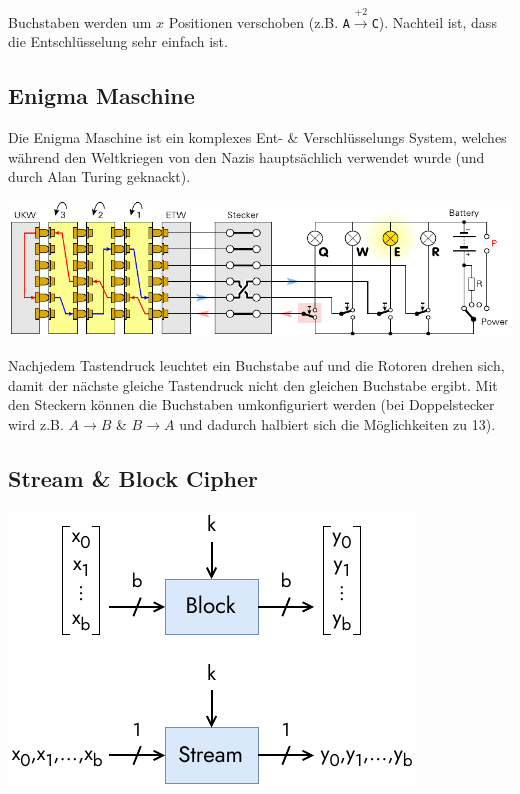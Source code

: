 \documentclass[
  10pt,
  a4paper,
  twocolumn]{article}
\begin{document}
Buchstaben werden um \(x\) Positionen verschoben (z.B.
\texttt{A}\(\overset{+2}{\rightarrow}\)\texttt{C}). Nachteil ist, dass
die Entschlüsselung sehr einfach ist.

\subsection{\texorpdfstring{Enigma Maschine
\href{https://www.youtube.com/watch?v=ybkkiGtJmkM}{\color{BrickRed}\faYoutube}}{Enigma Maschine }}\label{enigma-maschine}

Die Enigma Maschine ist ein komplexes Ent- \& Verschlüsselungs System,
welches während den Weltkriegen von den Nazis hauptsächlich verwendet
wurde (und durch Alan Turing geknackt).

\includegraphics{images/crypto/enigma.pdf}

Nachjedem Tastendruck leuchtet ein Buchstabe auf und die Rotoren drehen
sich, damit der nächste gleiche Tastendruck nicht den gleichen Buchstabe
ergibt. Mit den Steckern können die Buchstaben umkonfiguriert werden
(bei Doppelstecker wird z.B. \(A\rightarrow B\) \& \(B\rightarrow A\)
und dadurch halbiert sich die Möglichkeiten zu 13).

\subsection{Stream \& Block Cipher}\label{stream-block-cipher}

\begin{center}
\includegraphics{images/crypto/block_stream_cipher.pdf}
\end{center}
\end{document}
